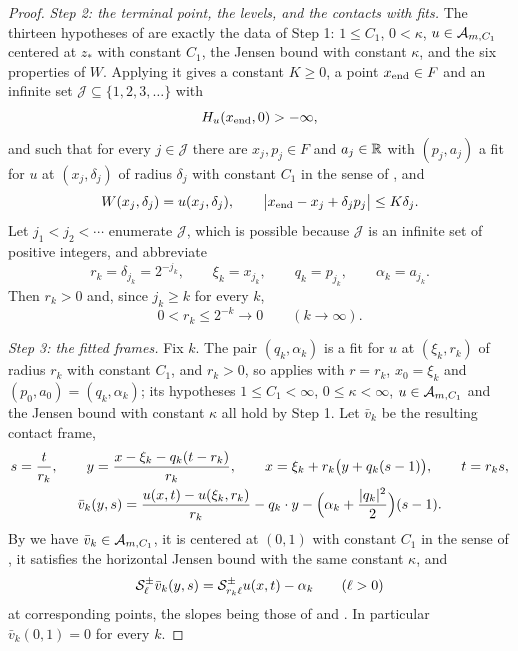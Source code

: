 \begin{proof}
\emph{Step 2: the terminal point, the levels, and the contacts with fits.}
The thirteen hypotheses of  are exactly the data of
Step 1: $1\le C_1$, $0<\kappa$, $u\in\mathcal{A}_{m,C_1}$ centered at $z_*$ with
constant $C_1$, the Jensen bound with constant $\kappa$, and the six properties
of $W$. Applying it gives a constant $K\ge0$, a point $x_{\rm end}\in F$ and an
infinite set $\mathcal J\subseteq\{1,2,3,\dots\}$ with
\begin{equation}\label{eq:lv-finite-hamiltonian}
  H_u(x_{\rm end},0)>-\infty ,
\end{equation}
and such that for every $j\in\mathcal J$ there are $x_j,p_j\in F$ and
$a_j\in\mathbb{R}$ with $(p_j,a_j)$ a fit for $u$ at $(x_j,\delta_j)$ of radius
$\delta_j$ with constant $C_1$ in the sense of , and
\begin{equation}\label{eq:lv-contact-data}
  W(x_j,\delta_j)=u(x_j,\delta_j),\qquad
  \bigl|x_{\rm end}-x_j+\delta_jp_j\bigr|\le K\delta_j .
\end{equation}
Let $j_1<j_2<\cdots$ enumerate $\mathcal J$, which is possible because
$\mathcal J$ is an infinite set of positive integers, and abbreviate
\[
  r_k=\delta_{j_k}=2^{-j_k},\qquad
  \xi_k=x_{j_k},\qquad q_k=p_{j_k},\qquad \alpha_k=a_{j_k}.
\]
Then $r_k>0$ and, since $j_k\ge k$ for every $k$,
\begin{equation}\label{eq:lv-scales}
  0<r_k\le2^{-k}\longrightarrow0\qquad(k\to\infty).
\end{equation}

\emph{Step 3: the fitted frames.}
Fix $k$. The pair $(q_k,\alpha_k)$ is a fit for $u$ at $(\xi_k,r_k)$ of radius
$r_k$ with constant $C_1$, and $r_k>0$, so 
applies with $r=r_k$, $x_0=\xi_k$ and $(p_0,a_0)=(q_k,\alpha_k)$; its hypotheses
$1\le C_1<\infty$, $0\le\kappa<\infty$, $u\in\mathcal{A}_{m,C_1}$ and the Jensen
bound with constant $\kappa$ all hold by Step 1. Let $\bar v_k$ be the resulting
contact frame,
\begin{equation}\label{eq:lv-frame}
\begin{gathered}
  s=\frac{t}{r_k},\qquad y=\frac{x-\xi_k-q_k(t-r_k)}{r_k},\qquad
  x=\xi_k+r_k\bigl(y+q_k(s-1)\bigr),\qquad t=r_ks,\\
  \bar v_k(y,s)=\frac{u(x,t)-u(\xi_k,r_k)}{r_k}-q_k\cdot y
     -\Bigl(\alpha_k+\frac{|q_k|^2}{2}\Bigr)(s-1).
\end{gathered}
\end{equation}
By  we have $\bar v_k\in\mathcal{A}_{m,C_1}$, it is
centered at $(0,1)$ with constant $C_1$ in the sense of ,
it satisfies the horizontal Jensen bound with the same constant $\kappa$, and
\begin{equation}\label{eq:lv-slope-covariance}
  \mathcal{S}_\ell^\pm\bar v_k(y,s)=\mathcal{S}_{r_k\ell}^\pm u(x,t)-\alpha_k
  \qquad(\ell>0)
\end{equation}
at corresponding points, the slopes being those of  and
. In particular $\bar v_k(0,1)=0$ for every $k$.


\end{proof}

